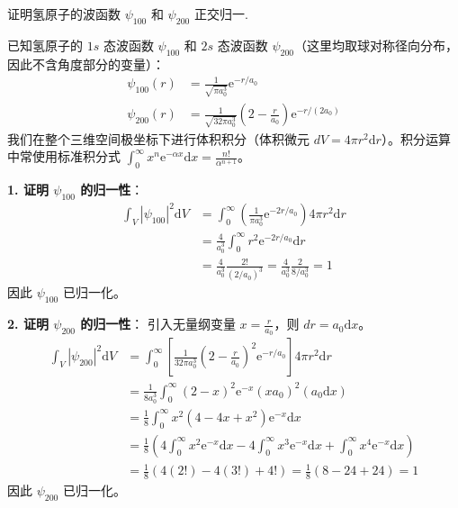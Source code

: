 \begin{exercise}\label{ex:25.4}
证明氢原子的波函数 $\psi_{100}$ 和 $\psi_{200}$ 正交归一.
\end{exercise}
\begin{solution}
已知氢原子的 $1s$ 态波函数 $\psi_{100}$ 和 $2s$ 态波函数 $\psi_{200}$（这里均取球对称径向分布，因此不含角度部分的变量）：
\begin{align*}
    \psi_{100}(r) &= \frac{1}{\sqrt{\pi a_0^3}} \mathrm{e}^{-r/a_0} \\
    \psi_{200}(r) &= \frac{1}{\sqrt{32\pi a_0^3}} \left( 2 - \frac{r}{a_0} \right) \mathrm{e}^{-r/(2a_0)}
\end{align*}
我们在整个三维空间极坐标下进行体积积分（体积微元 $dV = 4\pi r^2 \mathrm{d}r$）。积分运算中常使用标准积分式 $\int_0^\infty x^n \mathrm{e}^{-\alpha x} \mathrm{d}x = \frac{n!}{\alpha^{n+1}}$。

\textbf{1. 证明 $\psi_{100}$ 的归一性}：
\begin{align*}
    \int_V |\psi_{100}|^2 \mathrm{d}V &= \int_0^\infty \left( \frac{1}{\pi a_0^3} \mathrm{e}^{-2r/a_0} \right) 4\pi r^2 \mathrm{d}r \\
    &= \frac{4}{a_0^3} \int_0^\infty r^2 \mathrm{e}^{-2r/a_0} \mathrm{d}r \\
    &= \frac{4}{a_0^3} \frac{2!}{(2/a_0)^3} = \frac{4}{a_0^3} \frac{2}{8/a_0^3} = 1
\end{align*}
因此 $\psi_{100}$ 已归一化。

\textbf{2. 证明 $\psi_{200}$ 的归一性}：
引入无量纲变量 $x = \frac{r}{a_0}$，则 $dr = a_0 \mathrm{d}x$。
\begin{align*}
    \int_V |\psi_{200}|^2 \mathrm{d}V &= \int_0^\infty \left[ \frac{1}{32\pi a_0^3} \left( 2 - \frac{r}{a_0} \right)^2 \mathrm{e}^{-r/a_0} \right] 4\pi r^2 \mathrm{d}r \\
    &= \frac{1}{8a_0^3} \int_0^\infty (2 - x)^2 \mathrm{e}^{-x} (x a_0)^2 (a_0 \mathrm{d}x) \\
    &= \frac{1}{8} \int_0^\infty x^2 (4 - 4x + x^2) \mathrm{e}^{-x} \mathrm{d}x \\
    &= \frac{1}{8} \left( 4 \int_0^\infty x^2 \mathrm{e}^{-x} \mathrm{d}x - 4 \int_0^\infty x^3 \mathrm{e}^{-x} \mathrm{d}x + \int_0^\infty x^4 \mathrm{e}^{-x} \mathrm{d}x \right) \\
    &= \frac{1}{8} \left( 4(2!) - 4(3!) + 4! \right) = \frac{1}{8} (8 - 24 + 24) = 1
\end{align*}
因此 $\psi_{200}$ 已归一化。


\end{solution}
